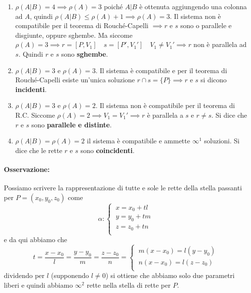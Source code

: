 \begin{enumerate}
    \item \(\rho(A|B) = 4 \implies \rho(A) = 3\) poiché \(A|B\) è ottenuta aggiungendo una colonna ad \(A\), quindi \(\rho(A|B) \le \rho(A) + 1 \implies \rho(A) =3 \). Il sistema non è compatibile per il teorema di Rouché-Capelli \(\implies r  \) e \(s\) sono o parallele e disgiunte, oppure sghembe. Ma siccome \(\rho(A) = 3 \implies r = [P,V_1] \quad s =[P', V_1'] \quad V_1 \neq V_1' \implies r\) non è parallela ad \(s\). Quindi \(r\) e \(s\) sono \textbf{sghembe}.
    \item \(\rho(A|B) = 3\) e \(\rho(A) =3\). Il sistema è compatibile e per il teorema di Rouché-Capelli  esiste un'unica soluzione \(r \cap s = \{P\} \implies r\) e \(s\) si dicono \textbf{incidenti}.
    \item \(\rho(A|B) = 3\) e \(\rho(A) = 2\). Il sistema non è compatibile per il teorema di R.C. Siccome \(\rho(A) =2 \implies V_1= V_1' \implies r\) è parallela a \(s\) e \(r \neq s\). Si dice che \(r\) e \(s\) sono \textbf{parallele e distinte}.
    \item \(\rho(A|B) = \rho(A) = 2\) il sistema è compatibile e ammette \(\infty^{1}\) soluzioni. Si dice che  le rette \(r\) e \(s\) sono \textbf{coincidenti}.
\end{enumerate}

\paragraph{Osservazione:} Possiamo scrivere la rappresentazione di tutte e sole le rette della stella passanti per \(P = (x_0, y_0, z_0)\) come \[
\alpha :
\begin{cases}
    \ x = x_0 + tl \\
    \ y = y_0 + tm \\
    \ z = z_0 + tn \\
\end{cases}
\] e da qui abbiamo che \[
t = \frac{x-x_0}{l}= \frac{y-y_0}{m} = \frac{z-z_0}{n} = 
\begin{cases}
    \ m(x-x_0) = l(y-y_0) \\
    \ n (x-x_0) = l(z-z_0) \\
\end{cases}
\] dividendo per \(l\) (supponendo \(l \neq 0\)) si ottiene che abbiamo solo due parametri liberi e quindi abbiamo \(\infty^{2}\) rette nella stella di rette per \(P\).

